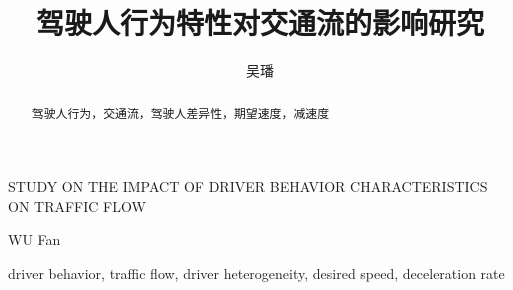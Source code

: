 \documentclass[unicode,master,printedition]{seuthesis} %
\begin{document}
\title{驾驶人行为特性对交通流的影响研究}{}{STUDY ON THE IMPACT OF DRIVER BEHAVIOR CHARACTERISTICS ON TRAFFIC FLOW}{}
\author{吴\quad{}璠}{WU Fan}
\authorizedate{}
\maketitle

\begin{abstract}{驾驶人行为，交通流，驾驶人差异性，期望速度，减速度}

\end{abstract}

\begin{englishabstract}{driver behavior, traffic flow, driver heterogeneity, desired speed, deceleration rate}

\end{englishabstract}


\begin{Main} %

%







\end{Main} %
\end{document}
